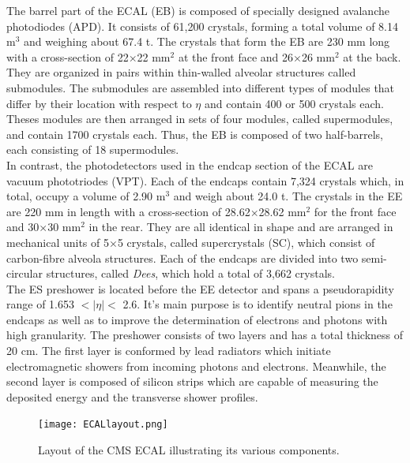 The barrel part of the ECAL (EB) is composed of specially designed avalanche photodiodes (APD). It consists of 61,200 crystals, forming a total volume of 8.14 m$^3$ and weighing about 67.4 t. The crystals that form the EB are 230 mm long with a cross-section of 22$\times$22 mm$^2$ at the front face and 26$\times$26 mm$^2$ at the back. They are organized in pairs within thin-walled alveolar structures called submodules. The submodules are assembled into different types of modules that differ by their location with respect to $\eta$ and contain 400 or 500 crystals each. Theses modules are then arranged in sets of four modules, called supermodules, and contain 1700 crystals each. Thus, the EB is composed of two half-barrels, each consisting of 18 supermodules.\\

In contrast, the photodetectors used in the endcap section of the ECAL are vacuum phototriodes (VPT)\cite{VPT}. Each of the endcaps contain 7,324 crystals which, in total, occupy a volume of 2.90 m$^3$ and weigh about 24.0 t. The crystals in the EE are 220 mm in length with a cross-section of 28.62$\times$28.62 mm$^2$ for the front face and 30$\times$30 mm$^2$ in the rear. They are all identical in shape and are arranged in mechanical units of 5$\times$5 crystals, called supercrystals (SC), which consist of carbon-fibre alveola structures. Each of the endcaps are divided into two semi-circular structures, called \textit{Dees}, which hold a total of 3,662 crystals. \\

The ES preshower is located before the EE detector and spans a pseudorapidity range of 1.653 $< |\eta| <$ 2.6. It's main purpose is to identify neutral pions in the endcaps as well as to improve the determination of electrons and photons with high granularity. The preshower consists of two layers and has a total thickness of 20 cm. The first layer is conformed by lead radiators which initiate electromagnetic showers from incoming photons and electrons. Meanwhile, the second layer is composed of silicon strips which are capable of measuring the deposited energy and the transverse shower profiles.

\begin{figure}[tb]
\begin{center}
\texttt{[image: ECALlayout.png]} 
\caption{Layout of the CMS ECAL illustrating its various components\cite{CMSdet1}.}
\label{CMS_ECAL_Layout}
\vspace{-1em}
\end{center}
\end{figure}

